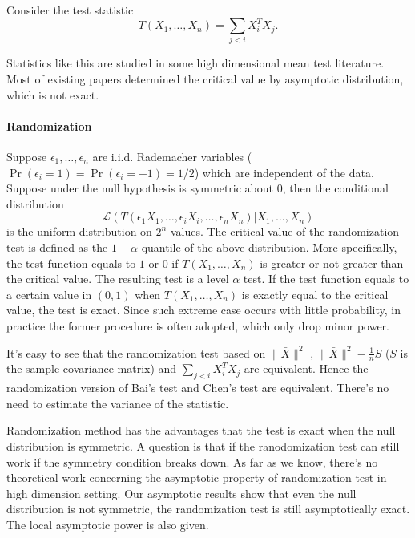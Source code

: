 \documentclass[review]{elsarticle}
\theoremstyle{plain}
\theoremstyle{definition}
\theoremstyle{remark}
\begin{document}
Consider the test statistic 
\begin{equation}
    T(X_1,\ldots,X_n)=\sum_{j<i}X_i^TX_j.
\end{equation}

Statistics like this are studied in some high dimensional mean test literature. Most of existing papers determined the critical value by asymptotic distribution, which is not exact.

\paragraph{Randomization}
Suppose $\epsilon_1,\ldots,\epsilon_n$ are i.i.d. Rademacher variables ($\Pr(\epsilon_i=1)=\Pr(\epsilon_i=-1)=1/2$) which are independent of the data.
Suppose under the null hypothesis is symmetric about $0$, then the conditional distribution
\begin{equation*}
    \mathcal{L}(T(\epsilon_1 X_1,\ldots,\epsilon_i X_i,\ldots,\epsilon_n X_n)|X_1,\ldots,X_n)
\end{equation*}
is the uniform distribution on $2^n$ values.
The critical value of the randomization test is defined as the $1-\alpha$ quantile of the above distribution.
 More specifically, the test function equals to $1$ or $0$ if $T(X_1,\ldots, X_n)$ is greater or not greater than the critical value. The resulting test is a level $\alpha$ test.
If the test function equals to a certain value in $(0,1)$ when $T(X_1,\ldots,X_n)$ is exactly equal to the critical value,  the test is exact.
Since such extreme case occurs with little probability, in practice the former procedure is often adopted, which only drop minor power.



It's easy to see that the randomization test based on $\|\bar{X}\|^2$ , 
$\|\bar{X}\|^2-\frac{1}{n}S$ ($S$ is the sample covariance matrix) and $\sum_{j<i}X_i^T X_j$ are equivalent. Hence the randomization version of Bai's test and Chen's test are equivalent. There's no need to estimate the variance of the statistic.


Randomization method has the advantages that the test is exact when the null distribution is symmetric. A question is that if the ranodomization test can still work if the symmetry condition breaks down.
As far as we know, there's no theoretical work concerning the asymptotic property of randomization test in high dimension setting.
Our asymptotic results show that even the null distribution is not symmetric, the randomization test is still asymptotically exact. 
The local asymptotic power is also given.
\end{document}
